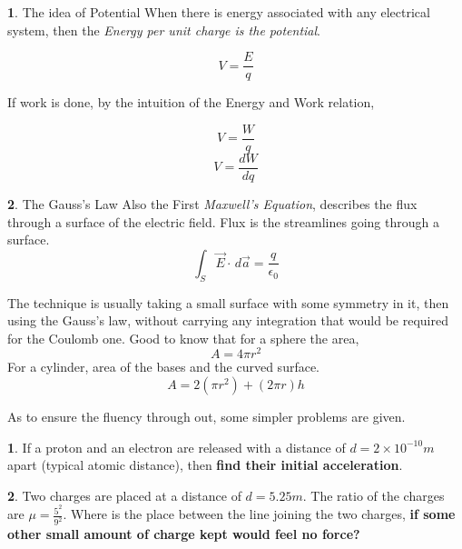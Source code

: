 \documentclass[11pt,a4paper,landscape,twocolumn]{article}
\theoremstyle{definition}
\newtheorem{fct}{ \framebox[0.05\textwidth]{{\sffamily Fact}} }
\theoremstyle{definition}
\newtheorem{pr}{ \framebox[0.05\textwidth]{{\sffamily Pr}} }
\theoremstyle{definition}
\theoremstyle{definition}
\begin{document}
\begin{fct} 

\textsf{The idea of Potential}
%
When there is energy associated with any electrical system, then the \emph{Energy per unit charge is the potential}.

\begin{equation}
V = \frac{E}{q}
\end{equation}

If work is done, by the intuition of the Energy and Work relation, 

\[ V = \frac{W}{q} \]
\[ V = \frac{dW}{dq} \]

\end{fct} 



\begin{fct}
\textsf{The Gauss's Law} Also the First \emph{Maxwell's Equation}, describes the flux through a surface of the electric field. Flux is the streamlines going through a surface. 
\begin{equation}
 \int_{S} \vec{E} \cdot \, d \vec{a} = \frac{q}{\epsilon_0} 
\end{equation}

The technique is usually taking a small surface with some symmetry in it, then using the Gauss's law, without carrying any integration that would be required for the Coulomb one. Good to know that for a sphere the area, 
\[ A = 4 \pi r^2 \]
For a cylinder, area of the bases and the curved surface.
\[ A = 2( \pi r^2 ) + (2 \pi r) h \]

\end{fct}

As to ensure the fluency through out, some simpler problems are given.


\begin{pr}
If a proton and an electron are released with a distance of $d = 2 \times 10^{-10} m$ apart (typical atomic distance), then \textbf{find their initial acceleration}.
\end{pr}


\begin{pr}

Two charges are placed at a distance of $d = 5.25 m$. The ratio of the charges are $ \mu = \frac{5^2}{9^2} $. Where is the place between the line joining the two charges, \textbf{if some other small amount of charge kept would feel no force?}



\end{pr}
\end{document}
